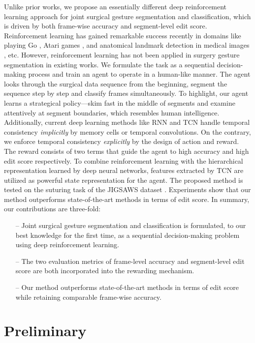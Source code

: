 \documentclass{llncs}
\begin{document}
Unlike prior works, we propose an essentially different deep reinforcement learning approach for joint surgical gesture segmentation and classification, which is driven by both frame-wise accuracy and segment-level edit score. Reinforcement learning has gained remarkable success recently in domains like playing Go \cite{silver2016mastering}, Atari games \cite{mnih2015human}, and anatomical landmark detection in medical images \cite{ghesu2016artificial}, etc. However, reinforcement learning has not been applied in surgery gesture segmentation in existing works. We formulate the task as a sequential decision-making process and train an agent to operate in a human-like manner. The agent looks through the surgical data sequence from the beginning, segment the sequence step by step and classify frames simultaneously. To highlight, our agent learns a strategical policy---skim fast in the middle of segments and examine attentively at segment boundaries, which resembles human intelligence. Additionally, current deep learning methods like RNN and TCN handle temporal consistency {\itshape implicitly} by memory cells or temporal convolutions. On the contrary, we enforce temporal consistency {\itshape explicitly} by the design of action and reward. The reward consists of two terms that guide the agent to high accuracy and high edit score respectively. To combine reinforcement learning with the hierarchical representation learned by deep neural networks, features extracted by TCN are utilized as powerful state representation for the agent. The proposed method is tested on the suturing task of the JIGSAWS dataset \cite{ahmidi2017dataset,gao2014jhu}. Experiments show that our method outperforms state-of-the-art methods in terms of edit score. In summary, our contributions are three-fold: 
\begin{enumerate} 
  \item[--] Joint surgical gesture segmentation and classification is formulated, to our best knowledge for the first time, as a sequential decision-making problem using deep reinforcement learning. 
  \item[--] The two evaluation metrics of frame-level accuracy and segment-level edit score are both incorporated into the rewarding mechanism.
  \item[--] Our method outperforms state-of-the-art methods in terms of edit score while retaining comparable frame-wise accuracy.
\end{enumerate}

\section{Preliminary}
\end{document}
